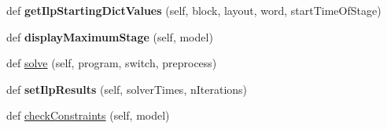 \begin{DoxyCompactItemize}
\item 
\hypertarget{classmapper_1_1src_1_1rmt_1_1orig__rmt__compiler_1_1_rmt_ilp_compiler_a49b5519f25e262bc25cc637ba078a8af}{}def {\bfseries get\+Ilp\+Starting\+Dict\+Values} (self, block, layout, word, start\+Time\+Of\+Stage)\label{classmapper_1_1src_1_1rmt_1_1orig__rmt__compiler_1_1_rmt_ilp_compiler_a49b5519f25e262bc25cc637ba078a8af}

\item 
\hypertarget{classmapper_1_1src_1_1rmt_1_1orig__rmt__compiler_1_1_rmt_ilp_compiler_a938317b26670b076d1069f0e8b1065c1}{}def {\bfseries display\+Maximum\+Stage} (self, model)\label{classmapper_1_1src_1_1rmt_1_1orig__rmt__compiler_1_1_rmt_ilp_compiler_a938317b26670b076d1069f0e8b1065c1}

\item 
def \hyperlink{classmapper_1_1src_1_1rmt_1_1orig__rmt__compiler_1_1_rmt_ilp_compiler_a7f8072086e33827e8aa0808e5648b76b}{solve} (self, program, switch, preprocess)
\item 
\hypertarget{classmapper_1_1src_1_1rmt_1_1orig__rmt__compiler_1_1_rmt_ilp_compiler_a8714a1a0564a8353606d8badf53e0b42}{}def {\bfseries set\+Ilp\+Results} (self, solver\+Times, n\+Iterations)\label{classmapper_1_1src_1_1rmt_1_1orig__rmt__compiler_1_1_rmt_ilp_compiler_a8714a1a0564a8353606d8badf53e0b42}

\item 
def \hyperlink{classmapper_1_1src_1_1rmt_1_1orig__rmt__compiler_1_1_rmt_ilp_compiler_a7e9f5156b3653a3030cf16a69f084866}{check\+Constraints} (self, model)
\end{DoxyCompactItemize}
